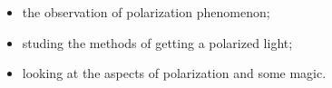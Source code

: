 \begin{itemize}
	\item the observation of polarization phenomenon;

	\phantom{239}

	\item studing the methods of getting a polarized light;

	\phantom{239}

	\item looking at the aspects of polarization and some magic.
\end{itemize}